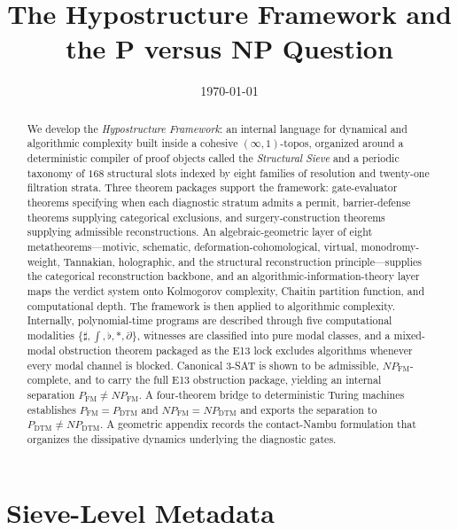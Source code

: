 \documentclass[11pt]{article}
\title{The Hypostructure Framework and the P versus NP Question}
\author{}
\date{\today}
\theoremstyle{definition}
\theoremstyle{remark}
\newcommand{\PFM}{P_{\mathrm{FM}}}
\newcommand{\NPFM}{NP_{\mathrm{FM}}}
\newcommand{\PDTM}{P_{\mathrm{DTM}}}
\newcommand{\NPDTM}{NP_{\mathrm{DTM}}}
\begin{document}
\maketitle

\begin{abstract}
We develop the \emph{Hypostructure Framework}: an internal language for dynamical and algorithmic complexity built inside a cohesive $(\infty,1)$-topos, organized around a deterministic compiler of proof objects called the \emph{Structural Sieve} and a periodic taxonomy of $168$ structural slots indexed by eight families of resolution and twenty-one filtration strata. Three theorem packages support the framework: gate-evaluator theorems specifying when each diagnostic stratum admits a permit, barrier-defense theorems supplying categorical exclusions, and surgery-construction theorems supplying admissible reconstructions. An algebraic-geometric layer of eight metatheorems---motivic, schematic, deformation-cohomological, virtual, monodromy-weight, Tannakian, holographic, and the structural reconstruction principle---supplies the categorical reconstruction backbone, and an algorithmic-information-theory layer maps the verdict system onto Kolmogorov complexity, Chaitin partition function, and computational depth. The framework is then applied to algorithmic complexity. Internally, polynomial-time programs are described through five computational modalities $\{\sharp,\int,\flat,\ast,\partial\}$, witnesses are classified into pure modal classes, and a mixed-modal obstruction theorem packaged as the E13 lock excludes algorithms whenever every modal channel is blocked. Canonical $3$-SAT is shown to be admissible, $\NPFM$-complete, and to carry the full E13 obstruction package, yielding an internal separation $\PFM \neq \NPFM$. A four-theorem bridge to deterministic Turing machines establishes $\PFM = \PDTM$ and $\NPFM = \NPDTM$ and exports the separation to $\PDTM \neq \NPDTM$. A geometric appendix records the contact-Nambu formulation that organizes the dissipative dynamics underlying the diagnostic gates.
\end{abstract}

\tableofcontents

\section{Sieve-Level Metadata}
\end{document}
